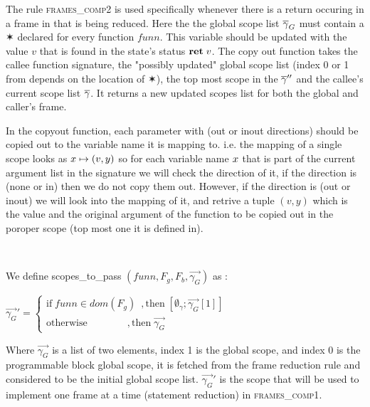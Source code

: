 \documentclass[UTF8]{article}
\begin{document}
The rule \textsc{frames\_comp2} is used specifically whenever there is a return occuring in a frame in that is being reduced. Here the the global scope list $\overline{\gamma}_G$ must contain a $\varstar$ declared for every function $funn$. This variable should be updated with the value $v$ that is found in the state's status $\textbf{ret}\;v$. The copy out function takes the callee function signature, the "possibly updated" global scope list (index 0 or 1 from depends on the location of $\varstar{}$), the top most scope in the $\overline{\gamma}''$ and the callee's current scope list $\overline{\gamma}$. It returns a new updated scopes list for both the global and caller's frame.

In the copyout function, each parameter with (out or inout directions) should be copied out to the variable name it is mapping to. i.e. the mapping of a single scope looks as  $ x \mapsto (v , y) $ so for each variable name $x$ that is part of the current argument list in the signature we will check the direction of it, if the direction is (none or in) then we do not copy them out. However, if the direction is (out or inout) we will look into the mapping of it, and retrive a tuple $(v,y)$ which is the value and the original argument of the function to be copied out in the poroper scope (top most one it is defined in).


\begin{figure}[ht!]
    \ottusedrule{\ottdruleframesXXcompOne{}} \\
    \ottusedrule{\ottdruleframesXXcompTwo{}}
\end{figure}


We define scopes\_to\_pass $ ( funn, F_g , F_b , \overrightarrow{\gamma_G}) $ as : \vspace{10pt}

 $  \overrightarrow{\gamma_G}' =\begin{cases}
            \mathrm{if} \; funn \in dom(F_g)    \hspace{6pt} ,
            \mathrm{then} \; [ \emptyset_{\gamma} ; \overrightarrow{\gamma_G}[1] ] \\
            \mathrm{otherwise}    \hspace{48pt}     , 
            \mathrm{then} \; \overrightarrow{\gamma_G} 
        \end{cases}$     \vspace{10pt}

Where $\overrightarrow{\gamma_G}$ is a list of two elements, index 1 is the global scope, and index 0 is the programmable block global scope, it is fetched from the frame reduction rule and considered to be the initial global scope list. $\overrightarrow{\gamma_G}'$ is the scope that will be used to implement one frame at a time (statement reduction) in \textsc{frames\_comp1}.
\end{document}
